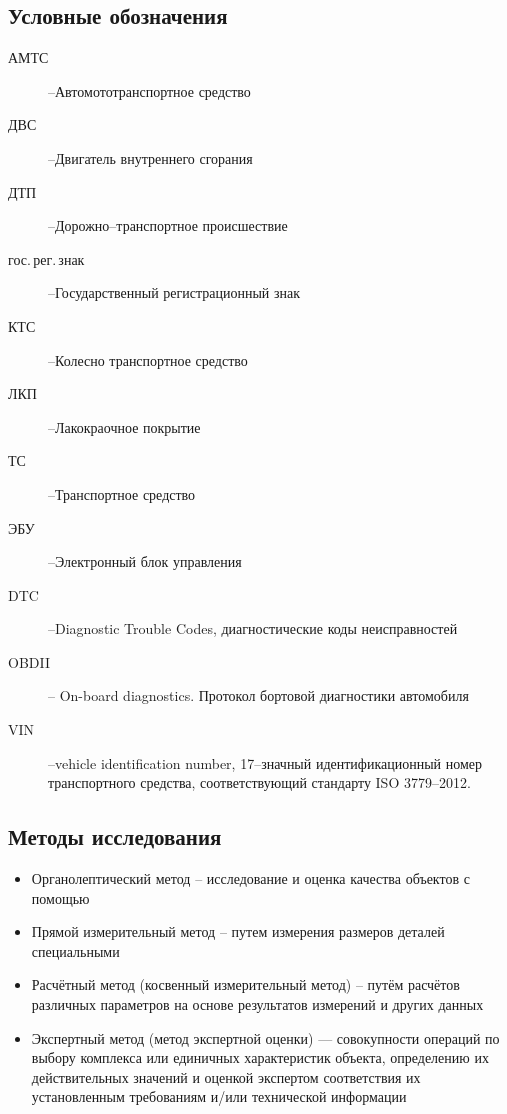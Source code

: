 \subsection{Условные обозначения}
\begin{description}
%	 
\item[АМТС] --Автомототранспортное средство
\item[ДВС] --Двигатель внутреннего сгорания
\item[ДТП] --Дорожно--транспортное происшествие
\item[гос.\,рег.\,знак] --Государственный регистрационный знак
\item[КТС] --Колесно транспортное средство 
\item[ЛКП] --Лакокраочное покрытие
\item[ТС] --Транспортное средство
\item[ЭБУ] --Электронный блок управления
\item[DTC] --Diagnostic Trouble Codes, диагностические коды неисправностей
\item[OBDII] -- On-board diagnostics. Протокол бортовой диагностики автомобиля
\item[VIN] --vehicle identification number, 17--значный идентификационный номер транспортного средства, соответствующий стандарту ISO 3779--2012.
%
\end{description}
\subsection{Методы исследования}
\begin{itemize}
\item  Органолептический метод – исследование и оценка качества объектов с помощью %
\item 	Прямой измерительный метод – путем измерения размеров деталей специальными %
\item Расчётный метод (косвенный измерительный метод) – путём расчётов различных параметров на основе результатов измерений и других данных
\item Экспертный метод (метод экспертной оценки) — совокупности операций по выбору комплекса или единичных характеристик объекта, определению их действительных значений и оценкой экспертом соответствия их установленным требованиям и/или технической информации
\end{itemize}
